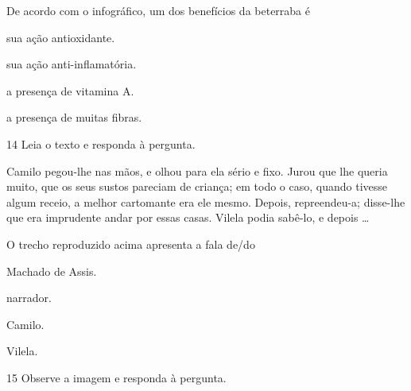 

De acordo com o infográfico, um dos benefícios da beterraba é

\begin{escolha}
  \item sua ação antioxidante.

  \item sua ação anti-inflamatória.

  \item a presença de vitamina A.

  \item a presença de muitas fibras.
\end{escolha}

\pagebreak
\num{14} Leia o texto e responda à pergunta.

\begin{myquote}
Camilo pegou-lhe nas mãos, e olhou para ela sério e fixo. Jurou que lhe
queria muito, que os seus sustos pareciam de criança; em todo o caso,
quando tivesse algum receio, a melhor cartomante era ele mesmo. Depois,
repreendeu-a; disse-lhe que era imprudente andar por essas casas. Vilela
podia sabê-lo, e depois \ldots

\end{myquote}

O trecho reproduzido acima apresenta a fala de/do

\begin{multicols}{2}
\begin{escolha}
  \item Machado de Assis.

  \item narrador.

  \item Camilo.

  \item Vilela.
\end{escolha}
\end{multicols}

\num{15} Observe a imagem e responda à pergunta.

\bigskip


